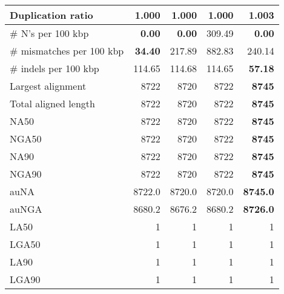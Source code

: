 \documentclass[12pt,a4paper]{article}
\begin{document}
\begin{table}[ht]
\begin{center}
\begin{tabular}{|l*{4}{|r}|}
Duplication ratio & {\bf 1.000} & {\bf 1.000} & {\bf 1.000} & 1.003 \\ \hline
\# N's per 100 kbp & {\bf 0.00} & {\bf 0.00} & 309.49 & {\bf 0.00} \\ \hline
\# mismatches per 100 kbp & {\bf 34.40} & 217.89 & 882.83 & 240.14 \\ \hline
\# indels per 100 kbp & 114.65 & 114.68 & 114.65 & {\bf 57.18} \\ \hline
Largest alignment & 8722 & 8720 & 8722 & {\bf 8745} \\ \hline
Total aligned length & 8722 & 8720 & 8722 & {\bf 8745} \\ \hline
NA50 & 8722 & 8720 & 8722 & {\bf 8745} \\ \hline
NGA50 & 8722 & 8720 & 8722 & {\bf 8745} \\ \hline
NA90 & 8722 & 8720 & 8722 & {\bf 8745} \\ \hline
NGA90 & 8722 & 8720 & 8722 & {\bf 8745} \\ \hline
auNA & 8722.0 & 8720.0 & 8720.0 & {\bf 8745.0} \\ \hline
auNGA & 8680.2 & 8676.2 & 8680.2 & {\bf 8726.0} \\ \hline
LA50 & 1 & 1 & 1 & 1 \\ \hline
LGA50 & 1 & 1 & 1 & 1 \\ \hline
LA90 & 1 & 1 & 1 & 1 \\ \hline
LGA90 & 1 & 1 & 1 & 1 \\ \hline
\end{tabular}
\end{center}
\end{table}
\end{document}

